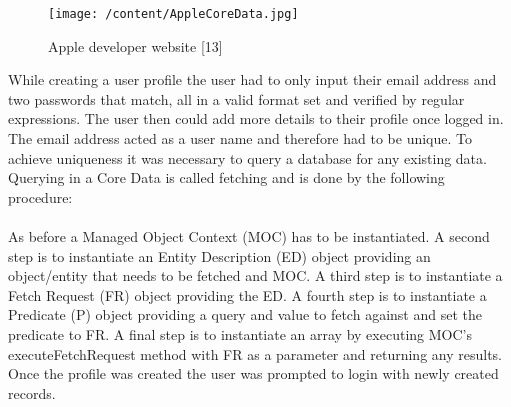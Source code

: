 \documentclass[12pt, a4paper]{report}   %
\begin{document}
\begin{enumerate}
\begin{figure}[H]
  \centering
	\texttt{[image: /content/AppleCoreData.jpg]}
	  \caption{Apple developer website [13]}
\end{figure}


While creating a user profile the user had to only input their email address and two passwords that match, all in a valid format set and verified by regular expressions. The user then could add more details to their profile once logged in. The email address acted as a user name and therefore had to be unique. To achieve uniqueness it was necessary to query a database for any existing data. Querying in a Core Data is called fetching and is done by the following procedure:\\ \\
As before a Managed Object Context (MOC) has to be instantiated. A second step is to instantiate an Entity Description (ED) object providing an object/entity that needs to be fetched and MOC. A third step is to instantiate a Fetch Request (FR) object providing the ED. A fourth step is to instantiate a Predicate (P) object providing a query and value to fetch against and set the predicate to FR. A final step is to instantiate an array by executing MOC's executeFetchRequest method with FR as a parameter and returning any results.
Once the profile was created the user was prompted to login with newly created records.



\end{enumerate}
\end{document}
